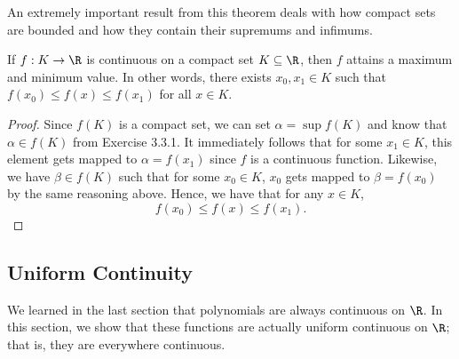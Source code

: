 An extremely important result from this theorem deals with how compact sets are bounded and how they contain their supremums and infimums.




\begin{tcolorbox}
    \begin{thm}
    If \( f: K \to \R  \) is continuous on a compact set \( K \subseteq \R  \), then \( f  \) attains a maximum and minimum value. In other words, there exists \( x_0, x_1 \in K  \) such that \( f(x_0) \leq f(x) \leq f(x_1) \) for all \( x \in K  \).
    \end{thm}
\end{tcolorbox}

\begin{proof}
    Since \( f(K) \) is a compact set, we can set \( \alpha = \sup f(K) \) and know that \( \alpha \in f(K) \) from Exercise 3.3.1. It immediately follows that for some \( x_1 \in K  \), this element gets mapped to \( \alpha = f(x_1) \) since \( f  \) is a continuous function. Likewise, we have \( \beta \in f(K) \) such that for some \( x_0 \in K  \), \( x_0  \) gets mapped to \( \beta = f(x_0 ) \) by the same reasoning above. Hence, we have that for any \( x \in K  \), 
    \[  f(x_0) \leq f(x) \leq f(x_1). \]
\end{proof}

\subsection{Uniform Continuity}

We learned in the last section that polynomials are always continuous on \( \R  \). In this section, we show that these functions are actually uniform continuous on \( \R  \); that is, they are everywhere continuous.

